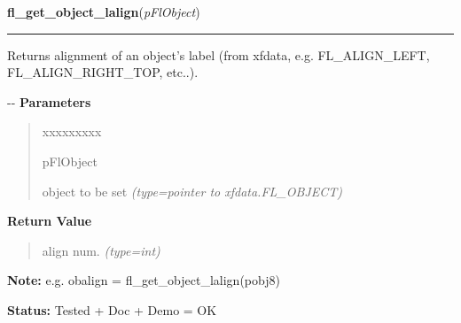 \hspace{.8\funcindent}\begin{boxedminipage}{\funcwidth}

    \raggedright \textbf{fl\_get\_object\_lalign}(\textit{pFlObject})

    \vspace{-1.5ex}

    \rule{\textwidth}{0.5\fboxrule}
\setlength{\parskip}{2ex}

Returns alignment of an object's label (from xfdata, e.g.
FL\_ALIGN\_LEFT, FL\_ALIGN\_RIGHT\_TOP, etc..).

-{}-
\setlength{\parskip}{1ex}
      \textbf{Parameters}
      \vspace{-1ex}

      \begin{quote}
        \begin{Ventry}{xxxxxxxxx}

          \item[pFlObject]


object to be set
            {\it (type=pointer to xfdata.FL\_OBJECT)}

        \end{Ventry}

      \end{quote}

      \textbf{Return Value}
    \vspace{-1ex}

      \begin{quote}

align num.
      {\it (type=int)}

      \end{quote}

\textbf{Note:} 
e.g. obalign = fl\_get\_object\_lalign(pobj8)


\textbf{Status:} 
Tested + Doc + Demo = OK


    \end{boxedminipage}

    \label{xformslib:flbasic:fl_set_object_lalign}

    \vspace{0.5ex}

